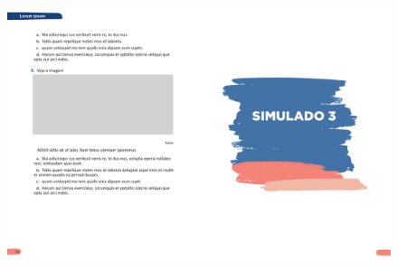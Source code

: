 \begin{figure}[htpb!]
\vspace*{-3cm}
\hspace*{-2.5cm}\includegraphics[scale=1]{../watermarks/3simulado5ano.pdf}
\end{figure}


%
%
%

